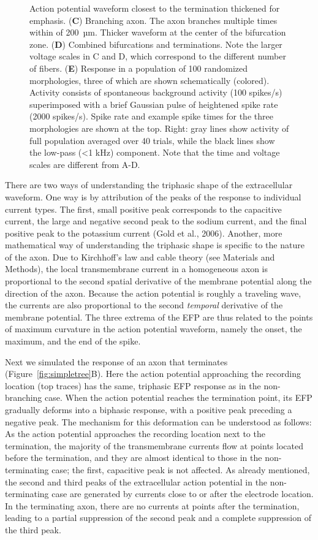 \documentclass[]{article}
\providecommand{\DIFaddtex}[1]{{\protect\color{blue}\uwave{#1}}} %
\providecommand{\DIFaddFL}[1]{\DIFadd{#1}} %
\providecommand{\DIFaddbeginFL}{} %
\providecommand{\DIFaddendFL}{} %
\providecommand{\DIFadd}[1]{\texorpdfstring{\DIFaddtex{#1}}{#1}} %
\begin{document}
\begin{figure}[htbp]
{Action potential waveform closest to the termination thickened for
emphasis. (\textbf{C}) Branching axon. The axon branches multiple times
within of 200~µm. Thicker waveform at the center of the bifurcation
zone. (\textbf{D}) Combined bifurcations and terminations. Note the
larger voltage scales in C and D, which correspond to the different
number of fibers. (\textbf{E}) Response in a population of 100
randomized morphologies, three of which are shown schematically
(colored). Activity consists of spontaneous background activity (100
spikes/s) superimposed with a brief Gaussian pulse of heightened spike
rate (2000 spikes/s). Spike rate and example spike times for the three
morphologies are shown at the top. Right: gray lines show activity of
full population averaged over 40 trials, while the black lines show the
low-pass (\textless{}1 kHz) component. Note that the time and voltage
scales are different from A-D. \DIFaddbeginFL \DIFaddFL{In all graphs, spatial scales are the
same, as indicated by the scale bar in A.}\DIFaddendFL }
\end{figure}

There are two ways of understanding the triphasic shape of the
extracellular waveform. One way is by attribution of the peaks of the
response to individual current types. The first, small positive peak
corresponds to the capacitive current, the large and negative second
peak to the sodium current, and the final positive peak to the potassium
current (Gold et al., 2006). Another, more mathematical way of
understanding the triphasic shape is specific to the nature of the axon.
Due to Kirchhoff's law and cable theory (see Materials and Methods), the
local transmembrane current in a homogeneous axon is proportional to the
second spatial derivative of the membrane potential along the direction
of the axon. Because the action potential is roughly a traveling wave,
the currents are also proportional to the second \emph{temporal}
derivative of the membrane potential. The three extrema of the EFP are
thus related to the points of maximum curvature in the action potential
waveform, namely the onset, the maximum, and the end of the spike.

Next we simulated the response of an axon that terminates
(Figure~\ref{fig:simpletree}B). Here the action potential approaching
the recording location (top traces) has the same, triphasic EFP response
as in the non-branching case. When the action potential reaches the
termination point, its EFP gradually deforms into a biphasic response,
with a positive peak preceding a negative peak. The mechanism for this
deformation can be understood as follows: As the action potential
approaches the recording location next to the termination, the majority
of the transmembrane currents flow at points located before the
termination, and they are almost identical to those in the
non-terminating case; the first, capacitive peak is not affected. As
already mentioned, the second and third peaks of the extracellular
action potential in the non-terminating case are generated by currents
close to or after the electrode location. In the terminating axon, there
are no currents at points after the termination, leading to a partial
suppression of the second peak and a complete suppression of the third
peak.
\end{document}
